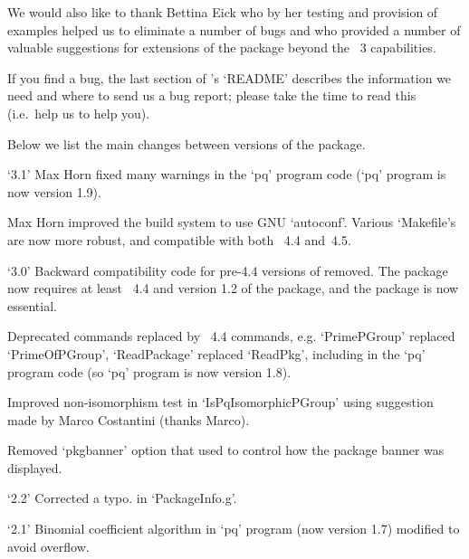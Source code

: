 We would also like to thank Bettina Eick who by her testing and provision
of examples helped us to eliminate a number of bugs and  who  provided  a
number of valuable suggestions for extensions of the package  beyond  the
{\GAP}~3 capabilities. 

If you find a bug, the last section of {\ANUPQ}'s `README' describes  the
information we need and where to send us a bug report;  please  take  the
time to read this (i.e.~help us to help you).


Below we list the main changes between versions of the {\ANUPQ} package.

\beginlist


\item{`3.1'}
Max Horn fixed many warnings in the `pq' program code (`pq' program is now
version 1.9).
\item{}
Max Horn improved the build system to use GNU `autoconf'. Various
`Makefile's are now more robust, and compatible with both {\GAP}~4.4 and~4.5.
  
\item{`3.0'}
Backward compatibility code for pre-4.4 versions of {\GAP}  removed.  The
{\ANUPQ} package now requires at least {\GAP}~4.4 and version 1.2 of  the
{\AutPGrp} package, and the {\AutPGrp} package is now essential.

\item{}
Deprecated commands replaced by {\GAP}~4.4 commands, e.g. `PrimePGroup'
replaced `PrimeOfPGroup', `ReadPackage' replaced `ReadPkg', including
in the `pq' program code (so `pq' program is now version 1.8).

\item{}
Improved non-isomorphism test in `IsPqIsomorphicPGroup' using  suggestion
made by Marco Costantini (thanks Marco).

\item{}
Removed `pkgbanner' option that used to control how the {\ANUPQ}  package
banner was displayed.

\item{`2.2'}
Corrected a typo. in `PackageInfo.g'.

\item{`2.1'}
Binomial coefficient algorithm in `pq' program (now version 1.7) modified
to avoid overflow.

